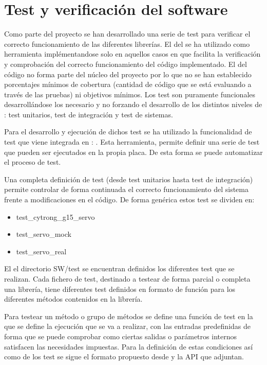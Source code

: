 	
\section{Test y verificación del software} \label{sec:SW:test}
    Como parte del proyecto se han desarrollado una serie de test para verificar el correcto funcionamiento de las diferentes librerías. El  del  se ha utilizado como herramienta implémentandose solo en aquellos casos en que facilita la verificación y comprobación del correcto funcionamiento del código implementado. El  del código no forma parte del núcleo del proyecto por lo que no se han establecido porcentajes mínimos de cobertura (cantidad de código que se está evaluando a través de las pruebas) ni objetivos mínimos. Los test son puramente funcionales desarrollándose los necesario y no forzando el desarrollo de los distintos niveles de : test unitarios, test de integración y test de sistemas. 

    Para el desarrollo y ejecución de dichos test se ha utilizado la funcionalidad de test que viene integrada en : . Esta herramienta, permite definir una serie de test que pueden ser ejecutados en la propia placa. De esta forma se puede automatizar el proceso de test.

    Una completa definición de test (desde test unitarios hasta test de integración) permite controlar de forma continuada el correcto funcionamiento del sistema frente a modificaciones en el código. De forma genérica estos test se dividen en:

    \begin{itemize}
        \item test\_cytrong\_g15\_servo 
        \item test\_servo\_mock
        \item test\_servo\_real
    \end{itemize}

    El el directorio SW/test se encuentran definidos los diferentes test que se realizan. Cada fichero de test, destinado a testear de forma parcial o completa una librería, tiene diferentes test definidos en formato de función para los diferentes métodos contenidos en la librería.

    Para testear un método o grupo de métodos se define una función de test en la que se define la ejecución que se va a realizar, con las entradas predefinidas de forma que se puede comprobar como ciertas salidas o parámetros internos satisfacen las necesidades impuestas. Para la definición de estas condiciones así como de los test se sigue el formato propuesto desde  y la API que adjuntan.


